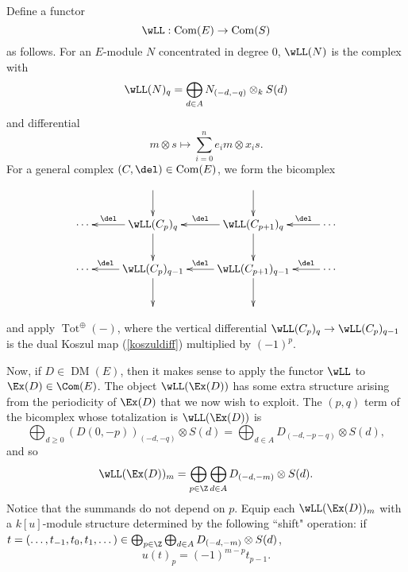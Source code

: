 \documentclass[12pt]{amsart}
\theoremstyle{definition}
\theoremstyle{remark}
\def\on{\operatorname}
\def\DM{\operatorname{DM}}
\begin{document}
\iffalse
Define a functor
$$
\wLL : \on{Com}(E) \to \on{Com}(S)
$$
as follows. For an $E$-module $N$ concentrated in degree 0, $\wLL(N)$ is the complex with
$$
\wLL(N)_q = \bigoplus_{d \in A} N_{(-d, -q)} \otimes_k S(d)
$$ 
and differential
\begin{equation}
\label{koszuldiff}
m \otimes s \mapsto \sum_{i = 0}^n e_im \otimes x_is.
\end{equation}
For a general complex $(C, \del) \in \on{Com}(E)$, we form the bicomplex
\begin{equation}
\label{bicomplex}
\xymatrix{ 
& \ar[d] & \ar[d]  & \\
\cdots & \wLL(C_{p})_{q}\ar[l]_-{ \del}  \ar[d]     & \wLL(C_{p + 1})_q   \ar[d] \ar[l]_-{ \del} & \cdots \ar[l]_-{\del} \\
\cdots & \wLL(C_{p })_{q- 1} \ar[d] \ar[l]_-{\del} &  \wLL(C_{p+1})_{q-1} \ar[d] \ar[l]_-{\del} & \ar[l]_-{\del}  \cdots \\
&&&
}
\end{equation}
and apply $\on{Tot}^{\oplus}( - )$, where the vertical differential $ \wLL(C_{p})_{q} \to  \wLL(C_{p})_{q-1}$ is the dual Koszul map (\ref{koszuldiff}) multiplied by $(-1)^p$. 

Now, if $D \in \DM(E)$, then it makes sense to apply the functor $\wLL$ to $\Ex(D) \in \Com(E)$. The object $\wLL(\Ex(D))$ has some extra structure arising from the periodicity of $\Ex(D)$ that we now wish to exploit. The $(p,q)$ term of the bicomplex whose totalization is $\wLL(\Ex(D))$ is 
$$
\bigoplus_{d \ge 0} (D(0, -p))_{(-d, -q)} \otimes S(d) = \bigoplus_{d \in A} D_{(-d, -p-q)} \otimes S(d),
$$
and so
$$
\wLL(\Ex(D))_m = \bigoplus_{p \in \Z}  \bigoplus_{d \in A} D_{(-d, -m)} \otimes S(d).
$$
Notice that the summands do not depend on $p$. Equip each $\wLL(\Ex(D))_m$ with a $k[u]$-module structure determined by the following ``shift" operation: if $t = (\dots, t_{-1}, t_0, t_1, \dots) \in \bigoplus_{p \in \Z}  \bigoplus_{d \in A} D_{(-d, -m)} \otimes S(d)$,
$$
u(t)_p = (-1)^{m - p} t_{p - 1}. 
$$
\end{document}
